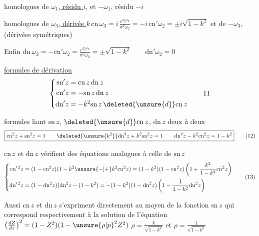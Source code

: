  homologues de \uline{$\omega_1$, résidu $i$}, et $-\omega_1$, résidu $-i$

 homologues de \uline{$\omega_3$, dérivée $k\,\mathrm{cn}\,\omega_3$}$=i\,\frac{e^{\eta_2\omega_2}}{\sigma^2\omega_2}=-i\,\mathrm{cn}'\omega_2=\pm i\sqrt{1-k^2}$ et de $-\omega_3$, (dérivées symétriques)

Enfin $\mathrm{dn}\,\omega_2=-\mathrm{cn}'\omega_2=\frac{e^{\eta_2\omega_2}}{\sigma^2\omega_2}=\pm\sqrt{1-k^2}\qquad\mathrm{dn}'\omega_2=0$

\uline{formules de dérivation}
\[
\left\{\begin{aligned}
\mathrm{sn}'z&=\mathrm{cn}\,z\,\mathrm{dn}\,z\\
\mathrm{cn}'z&=-\mathrm{sn}\,z\,\mathrm{dn}\,z\\
\mathrm{dn}'z&=-k^2\mathrm{sn}\,z\,\deleted{\unsure{d}}\mathrm{cn}\,z
\end{aligned}\right. \tag*{11}
\]

formules liant $\mathrm{sn}\,z$, $\deleted{\unsure{d}}\mathrm{cn}\,z$, $\mathrm{dn}\,z$ deux à deux
\[
\boxed{\mathrm{cn}^2z+\mathrm{sn}^2z=1\qquad
\deleted{\unsure{k^2}}\mathrm{dn}^2z+k^2\mathrm{sn}^2z=1\qquad
\mathrm{dn}^2z-k^2\mathrm{cn}^2z=1-k^2} \tag*{(12)}
\]

$\mathrm{cn}\,z$ et $\mathrm{dn}\,z$ vérifient des équations analogues à celle de $\mathrm{sn}\,z$
\[
\left\{\begin{aligned}
\mathrm{cn}^{\prime\,2}z&=(1-\mathrm{cn}^2z)(1-k^2\unsure{-|+}k^2\mathrm{cn}^2z)=(1-k^2)(1-\mathrm{cn}^2z)\left(1+\frac{k^2}{1-k^2}\mathrm{cn}^2z\right)\\
\mathrm{dn}^{\prime\,2}z&=(1-\mathrm{dn}^2z)(\mathrm{dn}^2z-(1-k^2)=-(1-k^2)(1-\mathrm{dn}^2z)\left(1-\frac{1}{1-k^2}\mathrm{dn}^2z\right)
\end{aligned}\right. \tag*{(13)}
\]

Aussi $\mathrm{cn}\,z$ et $\mathrm{dn}\,z$ s'expriment directement au moyen de la fonction $\mathrm{sn}\,z$ qui correspond respectivement à la solution de l'équation $\left(\frac{dZ}{dz}\right)^2=(1-Z^2)(1-{\unsure{\rho|p}}^{2}Z^2)$   $\rho=\frac{k}{\sqrt{1-k^2}}$ et $\rho=\frac{1}{\sqrt{1-k^2}}$

